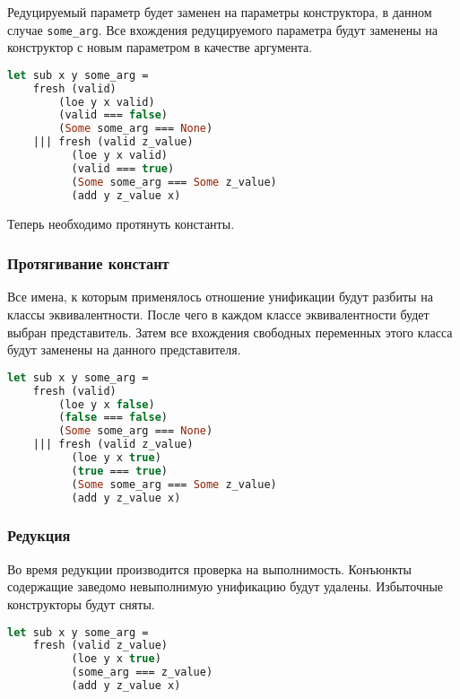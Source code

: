 Редуцируемый параметр будет заменен на параметры конструктора, в данном случае \verb|some_arg|. Все вхождения редуцируемого параметра будут заменены на конструктор с новым параметром в качестве аргумента.

\begin{lstlisting}[caption=Отношение после подстановки конструктора, language=OCaml, frame=single, label = sub]
 let sub x y some_arg =
    fresh (valid) 
        (loe y x valid)
        (valid === false) 
        (Some some_arg === None)
    ||| fresh (valid z_value)  
          (loe y x valid)
          (valid === true) 
          (Some some_arg === Some z_value) 
          (add y z_value x)
\end{lstlisting}

Теперь необходимо протянуть константы.

\subsubsection{Протягивание констант}

Все имена, к которым применялось отношение унификации будут разбиты на классы эквивалентности. После чего  в каждом классе эквивалентности будет выбран представитель. Затем все вхождения свободных переменных этого класса будут заменены на данного представителя.

\begin{lstlisting}[caption=Отношение после протягивания констант, language=OCaml, frame=single, label = sub]
 let sub x y some_arg =
    fresh (valid) 
        (loe y x false)
        (false === false) 
        (Some some_arg === None)
    ||| fresh (valid z_value)  
          (loe y x true)
          (true === true) 
          (Some some_arg === Some z_value) 
          (add y z_value x)
\end{lstlisting}

\subsubsection{Редукция}

Во время редукции производится проверка на выполнимость. Конъюнкты содержащие заведомо невыполнимую унификацию будут удалены. Избыточные конструкторы будут сняты. 

\begin{lstlisting}[caption=Отношение после редукции, language=OCaml, frame=single, label = sub]
 let sub x y some_arg =
    fresh (valid z_value)  
          (loe y x true)
          (some_arg === z_value) 
          (add y z_value x)
\end{lstlisting}


